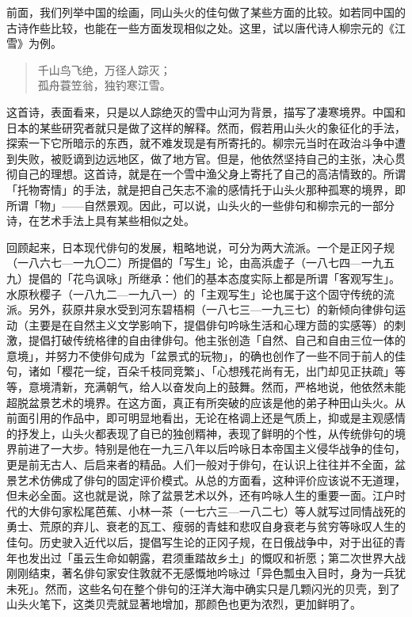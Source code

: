 {前面，我们列举中国的绘画，同山头火的佳句做了某些方面的比较。如若同中国的古诗作些比较，也能在一些方面发现相似之处。这里，试以唐代诗人柳宗元的《江雪》为例。

\begin{quote}
    千山鸟飞绝，万径人踪灭；\\
    孤舟蓑笠翁，独钓寒江雪。
\end{quote}

这首诗，表面看来，只是以人踪绝灭的雪中山河为背景，描写了凄寒境界。中国和日本的某些研究者就只是做了这样的解释。然而，假若用山头火的象征化的手法，探索一下它所暗示的东西，就不难发现是有所寄托的。柳宗元当时在政治斗争中遭到失败，被贬谪到边远地区，做了地方官。但是，他依然坚持自己的主张，决心贯彻自己的理想。这首诗，就是在一个雪中渔父身上寄托了自己的高洁情致的。所谓「托物寄情」的手法，就是把自己矢志不渝的感情托于山头火那种孤寒的境界，即所谓「物」——自然景观。因此，可以说，山头火的一些俳句和柳宗元的一部分诗，在艺术手法上具有某些相似之处。

回顾起来，日本现代俳句的发展，粗略地说，可分为两大流派。一个是正冈子规（一八六七—一九〇二）所提倡的「写生」论，由高浜虚子（一八七四—一九五九）提倡的「花鸟讽咏」所继承：他们的基本态度实际上都是所谓「客观写生」。水原秋樱子（一八九二—一九八一）的「主观写生」论也属于这个固守传统的流派。另外，荻原井泉水受到河东碧梧桐（一八七三—一九三七）的新倾向律俳句运动（主要是在自然主义文学影响下，提倡俳句吟咏生活和心理方茴的实感等）的刺激，提倡打破传统格律的自由律俳句。他主张创造「自然、自己和自由三位一体的意境」，并努力不使俳句成为「盆景式的玩物」，的确也创作了一些不同于前人的佳句，诸如「樱花一绽，百朵千枝同竞繁」、「心想残花尚有无，出门却见正扶疏」等等，意境清新，充满朝气，给人以奋发向上的鼓舞。然而，严格地说，他依然未能超脱盆景艺术的境界。在这方面，真正有所突破的应该是他的弟子种田山头火。从前面引用的作品中，即可明显地看出，无论在格调上还是气质上，抑或是主观感情的抒发上，山头火都表现了自已的独创糈神，表现了鲜明的个性，从传统俳句的境界前进了一大步。特别是他在一九三八年以后吟咏日本帝国主义侵华战争的佳句，更是前无古人、后启来者的精品。人们一般对于俳句，在认识上往往并不全面，盆景艺术仿佛成了俳句的固定评价模式。从总的方面看，这种评价应该说不无道理，但未必全面。这也就是说，除了盆景艺术以外，还有吟咏人生的重要一面。江户时代的大俳句家松尾芭蕉、小林一茶（一七六三—一八二七）等人就写过同情战死的勇士、荒原的弃儿、衰老的瓦工、瘦弱的青蛙和悲叹自身衰老与贫穷等咏叹人生的佳句。历史驶入近代以后，提倡写生论的正冈子规，在日俄战争中，对于出征的青年也发出过「虽云生命如朝露，君须重踏故乡土」的慨叹和祈愿；第二次世界大战刚刚结束，著名俳句家安住敦就不无感慨地吟咏过「异色瓢虫入目时，身为一兵犹未死」。然而，这些名句在整个俳句的汪洋大海中确实只是几颗闪光的贝壳，到了山头火笔下，这类贝壳就显著地增加，那颜色也更为浓烈，更加鲜明了。

}
